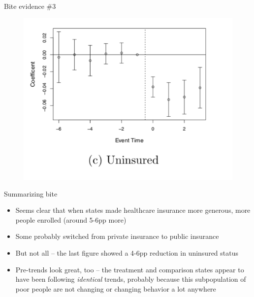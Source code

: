 \documentclass{beamer}
\begin{document}
\begin{frame}{Bite evidence \#3 }

	\begin{figure}
\includegraphics[scale=0.5]{./lecture_includes/Miller_Medicaid3.png}
	\end{figure}

\end{frame}

\begin{frame}{Summarizing bite}

\begin{itemize}

\item Seems clear that when states made healthcare insurance more generous, more people enrolled (around 5-6pp more)
\item Some probably switched from private insurance to public insurance
\item But not all -- the last figure showed a 4-6pp reduction in uninsured status
\item Pre-trends look great, too -- the treatment and comparison states appear to have been following \emph{identical} trends, probably because this subpopulation of poor people are not changing or changing behavior a lot anywhere

\end{itemize}

\end{frame}
\end{document}
